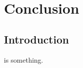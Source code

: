 \chapter{Conclusion}
\label{conclusion}

\newpage

\section{Introduction}

\noindent 
{} is something. 


